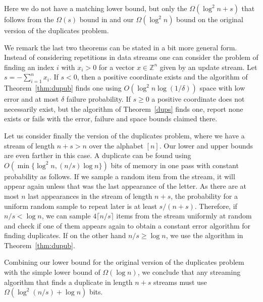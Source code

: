 Here we do not have a matching lower bound, but only the $\Omega(\log^2n+s)$ that
follows from the $\Omega(s)$ bound in \cite{GopalanR2009} and our
$\Omega(\log^2 n)$ bound on the original version of the duplicates problem.

We remark the last two theorems can be stated in a bit more general
form. Instead of considering repetitions in data streams one can consider the
problem of finding an index $i$ with $x_i>0$ for a vector
$x\in\mathbb Z^n$ given by an update stream. Let
$s=-\sum_{i=1}^nx_i$. If $s<0$, then a positive coordinate exists and the
algorithm of Theorem~\ref{thm:dupub} finds one using $O(\log^2 n\log(1/\delta))$
space with low error and at most $\delta$ failure probability.
If $s\ge0$ a positive coordinate does not necessarily exist, but the algorithm
of Theorem~\ref{dups} finds one, report none exists or fails with the error,
failure and space bounds claimed there.

Let us consider finally the version of the duplicates problem, where we have a
stream of length $n+s>n$ over the alphabet $[n]$. Our lower and upper bounds
are even farther in this case. A duplicate can be found using $O(\min\{\log^2n,
(n/s)\log n\})$ bits of memory in one pass with constant probability as
follows. If we sample a random item from the stream, it will appear again
unless that was the last appearance of the letter. As there are at most $n$
last appearances in the stream of length $n+s$, the probability for a uniform
random sample to repeat later is at least $s/(n+s)$. Therefore, if $n/s < \log
n$, we can sample $4\lceil n/s\rceil$ items from the stream uniformly at
random and check if one of them appears again to obtain a constant error
algorithm for finding duplicates. If on the other hand $n/s \geq \log n$, we use
the algorithm in Theorem~\ref{thm:dupub}.

Combining our lower bound for the original version of the duplicates problem 
with the simple lower bound of  $\Omega(\log n)$, we conclude that any 
streaming algorithm that finds a duplicate in length $n+s$ streams must use 
$\Omega(\log^2(n/s)+ \log n)$ bits.

